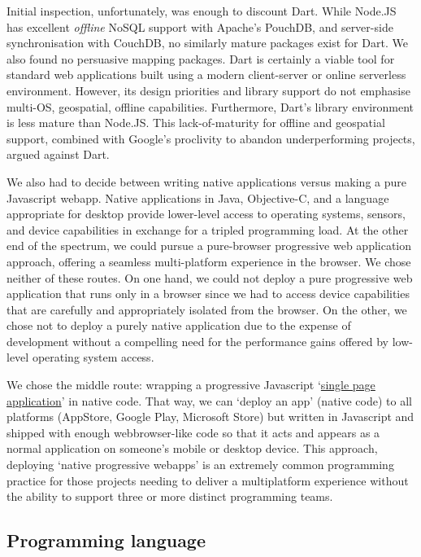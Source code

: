 \documentclass[a4paper,headings=small fontsize=10pt]{scrreprt}
\begin{document}
Initial inspection, unfortunately, was enough to discount Dart. While
Node.JS has excellent \emph{offline} NoSQL support with Apache's
PouchDB, and server-side synchronisation with CouchDB, no similarly
mature packages exist for Dart. We also found no persuasive mapping
packages. Dart is certainly a viable tool for standard web applications
built using a modern client-server or online serverless environment.
However, its design priorities and library support do not emphasise
multi-OS, geospatial, offline capabilities. Furthermore, Dart's library
environment is less mature than Node.JS. This lack-of-maturity for
offline and geospatial support, combined with Google's proclivity to
abandon underperforming projects, argued against Dart.

We also had to decide between writing native applications versus making
a pure Javascript webapp. Native applications in Java, Objective-C, and
a language appropriate for desktop provide lower-level access to
operating systems, sensors, and device capabilities in exchange for a
tripled programming load. At the other end of the spectrum, we could
pursue a pure-browser progressive web application approach, offering a
seamless multi-platform experience in the browser. We chose neither of
these routes. On one hand, we could not deploy a pure progressive web
application that runs only in a browser since we had to access device
capabilities that are carefully and appropriately isolated from the
browser. On the other, we chose not to deploy a purely native
application due to the expense of development without a compelling need
for the performance gains offered by low-level operating system access.

We chose the middle route: wrapping a progressive Javascript
`\href{https://en.wikipedia.org/wiki/Single-page_application}{{single
page application}}' in native code. That way, we can `deploy an app'
(native code) to all platforms (AppStore, Google Play, Microsoft Store)
but written in Javascript and shipped with enough webbrowser-like code
so that it acts and appears as a normal application on someone's mobile
or desktop device. This approach, deploying `native progressive webapps'
is an extremely common programming practice for those projects needing
to deliver a multiplatform experience without the ability to support
three or more distinct programming teams.

\subsection{Programming language}
\end{document}
